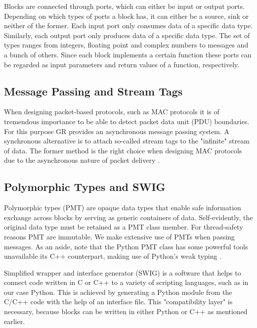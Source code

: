 Blocks are connected through ports, which can either be input or output ports. Depending on which types of ports a block has, it can either be a source, sink or neither of the former. 
Each input port only consumes data of a specific data type. Similarly, each output port only produces data of a specific data type. The set of types ranges from integers, floating point and complex numbers to messages and a bunch of others. Since each block implements a certain function these ports can be regarded as input parameters and return values of a function, respectively.

\subsection{Message Passing and Stream Tags}

When designing packet-based protocols, such as MAC protocols it is of tremendous importance to be able to detect packet data unit (PDU) boundaries. For this purpose GR provides an asynchronous message passing system. A synchronous alternative is to attach so-called stream tags to the "infinite" stream of data. The former method is the right choice when designing MAC protocols due to the asynchronous nature of packet delivery \cite{GR1}\cite{GRDocs}.  

\subsection{Polymorphic Types and SWIG} 

Polymorphic types (PMT) are opaque data types that enable safe information exchange across blocks by serving as generic containers of data. Self-evidently, the original data type must be retained as a PMT class member. For thread-safety reasons PMT are immutable. We make extensive use of PMTs when passing messages. As an aside, note that the Python PMT class has some powerful tools unavailable its C++ counterpart, making use of Python's weak typing \cite{GRDocs}.

Simplified wrapper and interface generator (SWIG) is a software that helps to connect code written in C or C++ to a variety of scripting languages, such as in our case Python. This is achieved by generating a Python module from the C/C++ code with the help of an interface file. This "compatibility layer" is necessary, because blocks can be written in either Python or C++ as mentioned earlier.


